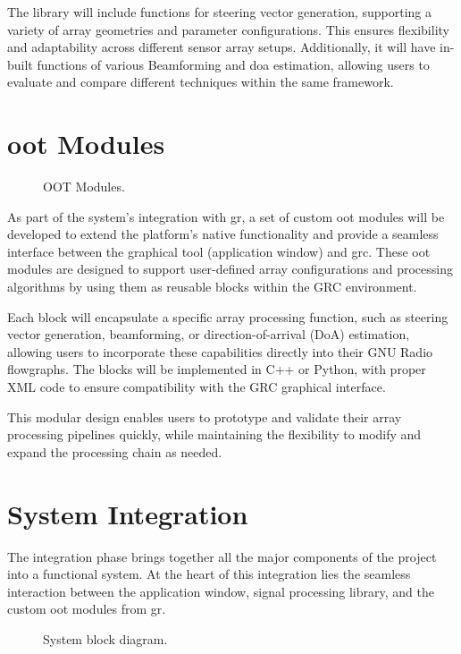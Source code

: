 The library will include functions for steering vector generation, supporting a variety of array geometries and parameter configurations. This ensures flexibility and adaptability across different sensor array setups. Additionally, it will have in-built functions of various Beamforming and \ac{doa} estimation, allowing users to evaluate and compare different techniques within the same framework.

\section{\ac{oot} Modules}

\begin{figure} [h]
	\centering
	\caption{OOT Modules.}
\end{figure}

As part of the system’s integration with \acl{gr}, a set of custom \ac{oot} modules will be developed to extend the platform’s native functionality and provide a seamless interface between the graphical tool (application window) and \acf{grc}. These \ac{oot} modules are designed to support user-defined array configurations and processing algorithms by using them as reusable blocks within the GRC environment.

Each block will encapsulate a specific array processing function, such as steering vector generation, beamforming, or direction-of-arrival (DoA) estimation, allowing users to incorporate these capabilities directly into their GNU Radio flowgraphs. The blocks will be implemented in C++ or Python, with proper XML code to ensure compatibility with the GRC graphical interface.

This modular design enables users to prototype and validate their array processing pipelines quickly, while maintaining the flexibility to modify and expand the processing chain as needed.

\section{System Integration}

The integration phase brings together all the major components of the project into a functional system. At the heart of this integration lies the seamless interaction between the application window, signal processing library, and the custom \ac{oot} modules from \ac{gr}.

\begin{figure}[H]
	\centering
	\caption{System block diagram.}
\end{figure}


